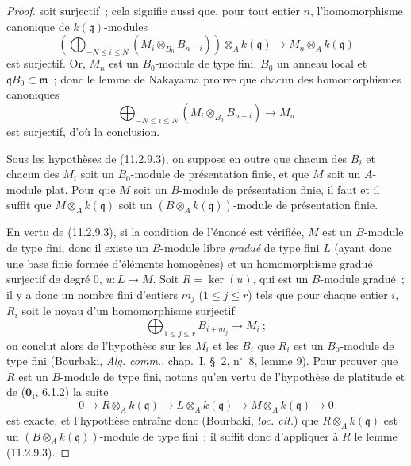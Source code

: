 \begin{proof}

soit surjectif~; cela signifie aussi que, pour tout entier $n$,
l'homomorphisme canonique de $k(\mathfrak q)$-modules
\[
\left(\bigoplus_{-N\leq i\leq N}(M_i\otimes_{B_0}B_{n-i})\right)
\otimes_Ak(\mathfrak q)\longrightarrow M_n\otimes_Ak(\mathfrak q)
\]
est surjectif. Or, $M_n$ est un $B_0$-module de type fini, $B_0$ un anneau
local et $\mathfrak qB_0\subset\mathfrak m$~; donc le lemme de Nakayama prouve
que chacun des homomorphismes canoniques
\[
\bigoplus_{-N\leq i\leq N}(M_i\otimes_{B_0}B_{n-i})\longrightarrow M_n
\]
est surjectif, d'où la conclusion.

\begin{corollary}[11.2.9.4]
\label{IV.11.2.9.4-fr}
Sous les hypothèses de (11.2.9.3), on suppose en outre que chacun des $B_i$ et
chacun des $M_i$ soit un $B_0$-module de présentation finie, et que $M$ soit
un $A$-module plat. Pour que $M$ soit un $B$-module de présentation finie, il
faut et il suffit que $M\otimes_Ak(\mathfrak q)$ soit un
$(B\otimes_Ak(\mathfrak q))$-module de présentation finie.
\end{corollary}

En vertu de (11.2.9.3), si la condition de l'énoncé est vérifiée, $M$ est un
$B$-module de type fini, donc il existe un $B$-module libre \emph{gradué} de
type fini $L$ (ayant donc une base finie formée d'éléments homogènes) et un
homomorphisme gradué surjectif de degré 0, $u:L\to M$. Soit $R=\ker(u)$, qui
est un $B$-module gradué~; il y a donc un nombre fini d'entiers $m_j$
($1\leq j\leq r$) tels que pour chaque entier $i$, $R_i$ soit le noyau d'un
homomorphisme surjectif
\[
\bigoplus_{1\leq j\leq r}B_{i+m_j}\longrightarrow M_i~;
\]
on conclut alors de l'hypothèse sur les $M_i$ et les $B_i$ que $R_i$ est un
$B_0$-module de type fini (Bourbaki, \emph{Alg. comm.}, chap.~I, \S~2,
n$^\circ$~8, lemme 9). Pour prouver que $R$ est un $B$-module de type fini,
notons qu'en vertu de l'hypothèse de platitude et de
($\mathbf 0_{\mathrm I}$, 6.1.2) la suite
\[
0\longrightarrow R\otimes_Ak(\mathfrak q)
\longrightarrow L\otimes_Ak(\mathfrak q)
\longrightarrow M\otimes_Ak(\mathfrak q)\longrightarrow0
\]
est exacte, et l'hypothèse entraîne donc (Bourbaki, \emph{loc. cit.}) que
$R\otimes_Ak(\mathfrak q)$ est un $(B\otimes_Ak(\mathfrak q))$-module de type
fini~; il suffit donc d'appliquer à $R$ le lemme (11.2.9.3).


\end{proof}
